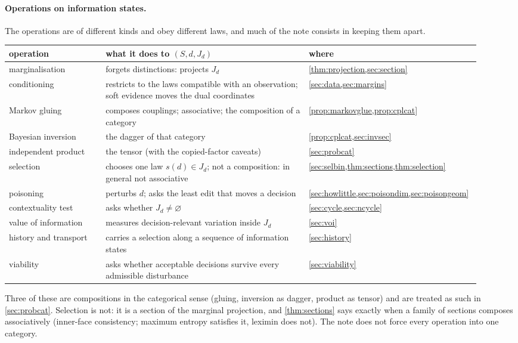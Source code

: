 \documentclass[11pt]{article}
\theoremstyle{definition}\newtheorem{definition}[theorem]{Definition}\newtheorem{remark}[theorem]{Remark}\newtheorem{example}[theorem]{Example}\newtheorem{problem}[theorem]{Open problem}\crefname{problem}{Problem}{Problems}
\begin{document}
\paragraph{Operations on information states.} The operations are of different kinds and obey different laws, and much of the note consists in keeping them apart.
\begin{center}\small
\begin{tabular}{p{0.2\linewidth}p{0.42\linewidth}p{0.3\linewidth}}
\toprule
operation & what it does to $(S,d,J_d)$ & where\\\midrule
marginalisation & forgets distinctions: projects $J_d$ & \cref{thm:projection,sec:section}\\
conditioning & restricts to the laws compatible with an observation; soft evidence moves the dual coordinates & \cref{sec:data,sec:margins}\\
Markov gluing & composes couplings; associative; the composition of a category & \cref{prop:markovglue,prop:cplcat}\\
Bayesian inversion & the dagger of that category & \cref{prop:cplcat,sec:invsec}\\
independent product & the tensor (with the copied-factor caveats) & \cref{sec:probcat}\\
selection & chooses one law $s(d)\in J_d$; not a composition: in general not associative & \cref{sec:selbin,thm:sections,thm:selection}\\
poisoning & perturbs $d$; asks the least edit that moves a decision & \cref{sec:howlittle,sec:poisondim,sec:poisongeom}\\
contextuality test & asks whether $J_d\ne\varnothing$ & \cref{sec:cycle,sec:ncycle}\\
value of information & measures decision-relevant variation inside $J_d$ & \cref{sec:voi}\\
history and transport & carries a selection along a sequence of information states & \cref{sec:history}\\
viability & asks whether acceptable decisions survive every admissible disturbance & \cref{sec:viability}\\
\bottomrule
\end{tabular}
\end{center}
Three of these are compositions in the categorical sense (gluing, inversion as dagger, product as tensor) and are treated as such in \cref{sec:probcat}. Selection is not: it is a section of the marginal projection, and \cref{thm:sections} says exactly when a family of sections composes associatively (inner-face consistency; maximum entropy satisfies it, leximin does not). The note does not force every operation into one category.
\end{document}
